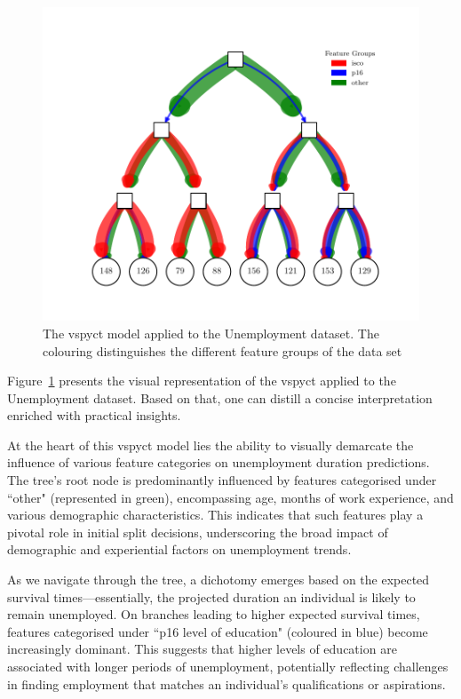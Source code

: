 \documentclass[3p,review,authoryear]{elsarticle}
\begin{document}
\begin{figure}[h!]
    \centering
    \includegraphics{hecat_tree_old_temp.pdf}
    \caption{The \gls{vspyct} model applied to the Unemployment dataset. The colouring distinguishes the different feature groups of the data set}
    \label{fig:inter_tree}
\end{figure}

Figure~\ref{fig:inter_tree} presents the visual representation of the \gls{vspyct} applied to the Unemployment dataset.
Based on that, one can distill a concise interpretation enriched with practical insights.

At the heart of this \gls{vspyct} model lies the ability to visually demarcate the influence of various feature categories on unemployment duration predictions.
The tree's root node is predominantly influenced by features categorised under ``other" (represented in green), encompassing age, months of work experience, and various demographic characteristics.
This indicates that such features play a pivotal role in initial split decisions, underscoring the broad impact of demographic and experiential factors on unemployment trends.

As we navigate through the tree, a dichotomy emerges based on the expected survival times—essentially, the projected duration an individual is likely to remain unemployed.
On branches leading to higher expected survival times, features categorised under ``p16 level of education" (coloured in blue) become increasingly dominant.
This suggests that higher levels of education are associated with longer periods of unemployment, potentially reflecting challenges in finding employment that matches an individual's qualifications or aspirations.
\end{document}
